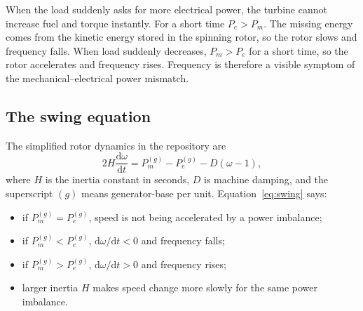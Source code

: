 \documentclass[11pt]{article}
\newcommand{\Pe}{\ensuremath{P_{e}}}
\newcommand{\Pm}{\ensuremath{P_{m}}}
\begin{document}
\begin{novicebox}
When the load suddenly asks for more electrical power, the turbine cannot
increase fuel and torque instantly.  For a short time $\Pe>\Pm$.  The missing
energy comes from the kinetic energy stored in the spinning rotor, so the rotor
slows and frequency falls.  When load suddenly decreases, $\Pm>\Pe$ for a
short time, so the rotor accelerates and frequency rises.  Frequency is
therefore a visible symptom of the mechanical--electrical power mismatch.
\end{novicebox}

\subsection{The swing equation}
The simplified rotor dynamics in the repository are
\begin{equation}
  2H\frac{\mathrm d\omega}{\mathrm dt}
  = P_m^{(g)}-P_e^{(g)}-D(\omega-1),
  \label{eq:swing}
\end{equation}
where $H$ is the inertia constant in seconds, $D$ is machine damping, and the
superscript $(g)$ means generator-base per unit.  Equation~\eqref{eq:swing}
says:
\begin{itemize}
  \item if $P_m^{(g)}=P_e^{(g)}$, speed is not being accelerated by a power
        imbalance;
  \item if $P_m^{(g)}<P_e^{(g)}$, $\mathrm d\omega/\mathrm dt<0$ and frequency
        falls;
  \item if $P_m^{(g)}>P_e^{(g)}$, $\mathrm d\omega/\mathrm dt>0$ and frequency
        rises;
  \item larger inertia $H$ makes speed change more slowly for the same power
        imbalance.
\end{itemize}
\end{document}
